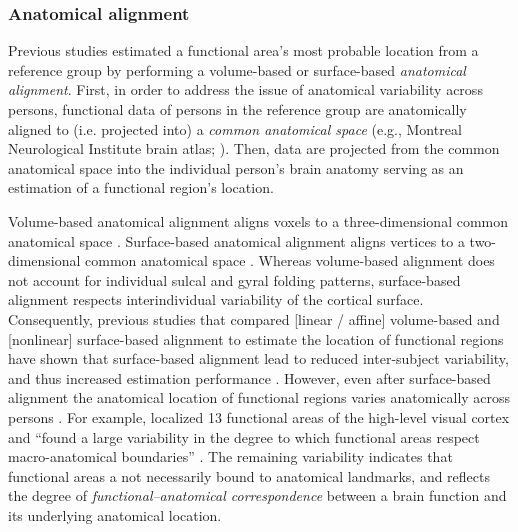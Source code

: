\subsubsection{Anatomical alignment}

Previous studies estimated a functional area's most probable location from a
reference group by performing a volume-based
\citep[e.g.,][]{zhen2017quantifying, zhen2015quantifying} or surface-based
\citep[e.g.,][]{frost2012measuring, weiner2018defining,
rosenke2021probabilistic, wang2015probabilistic} \textit{anatomical alignment}.
%
First, in order to address the issue of anatomical variability across persons,
functional data of persons in the reference group are anatomically aligned to
(i.e.  projected into) a \textit{common anatomical space} (e.g., Montreal
Neurological Institute brain atlas; \citep[MNI152,][]{fonov2011unbiased}).
Then, data are projected from the common anatomical space into the individual
person's brain anatomy serving as an estimation of a functional region's
location.

Volume-based anatomical alignment \citep[s.][for a review]{klein2009evaluation}
aligns voxels to a three-dimensional common anatomical space \citep[e.g., MNI152
atlas;][]{fonov2011unbiased}.
Surface-based anatomical alignment \citep{fischl1999cortical, yeo2009spherical}
aligns vertices to a two-dimensional common anatomical space \citep[e.g.,
FreeSurfer's fsaverage template;][]{fischl1999high}.
Whereas volume-based alignment does not account for individual sulcal and gyral
folding patterns, surface-based alignment respects interindividual variability
of the cortical surface.
Consequently, previous studies that compared  [linear / affine] volume-based and
[nonlinear] surface-based alignment to estimate the location of functional
regions have shown that surface-based alignment lead to reduced inter-subject
variability, and thus increased estimation performance
\citep{rosenke2021probabilistic, frost2012measuring, wang2015probabilistic,
weiner2018defining}.
However, even after surface-based alignment the anatomical location of
functional regions varies anatomically across persons
\citep[e.g.,][]{coalson2018impact, benson2014correction, natu2021sulcal,
wang2015probabilistic, frost2012measuring, langers2014assessment, weiner2014mid,
rosenke2021probabilistic}.
For example, \citet{frost2012measuring} localized 13 functional areas of the
high-level visual cortex and ``found a large variability in the degree to which
functional areas respect macro-anatomical boundaries''
\citep{frost2012measuring}.
The remaining variability indicates that functional areas a not necessarily
bound to anatomical landmarks, and reflects the degree of
\textit{functional--anatomical correspondence} between a brain function and its
underlying anatomical location.


